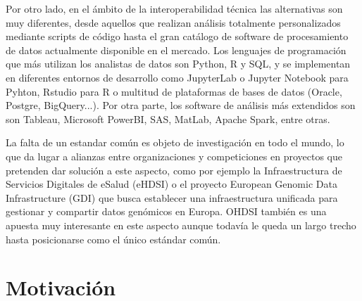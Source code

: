 Por otro lado, en el ámbito de la interoperabilidad técnica las alternativas son muy diferentes, desde aquellos que realizan análisis totalmente personalizados mediante scripts de código hasta el gran catálogo de software de procesamiento de datos actualmente disponible en el mercado. Los lenguajes de programación que más utilizan los analistas de datos son Python, R y SQL, y se implementan en diferentes entornos de desarrollo como JupyterLab o Jupyter Notebook para Pyhton, Rstudio para R o multitud de plataformas de bases de datos (Oracle, Postgre, BigQuery...). Por otra parte, los software de análisis más extendidos son son Tableau, Microsoft PowerBI, SAS, MatLab, Apache Spark, entre otras. 


La falta de un estandar común es objeto de investigación en todo el mundo, lo que da lugar a alianzas entre organizaciones y competiciones en proyectos que pretenden dar solución a este aspecto, como por ejemplo la Infraestructura de Servicios Digitales de eSalud (eHDSI) \parencite{DHE2023eHDSI} %
o el proyecto European Genomic Data Infrastructure (GDI) \parencite{GDI2022GDI} que busca establecer una infraestructura unificada para gestionar y compartir datos genómicos en Europa. OHDSI también es una apuesta muy interesante en este aspecto aunque todavía le queda un largo trecho hasta posicionarse como el único estándar común.



\section{Motivación} \label{sec:01Motivacion}

